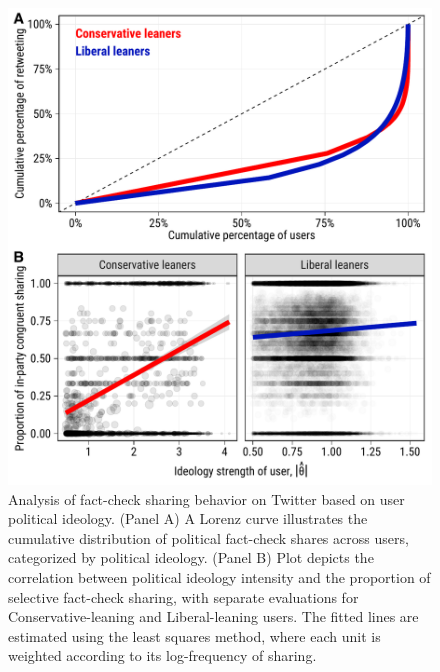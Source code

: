\documentclass[
  12pt,
]{article}
\begin{document}
\begin{figure}[!ht]
\centering
    \includegraphics[width=\textwidth]{../fig/merged_fig3.pdf}
    \caption{Analysis of fact-check sharing behavior on Twitter based on user political ideology. (Panel A) A Lorenz curve illustrates the cumulative distribution of political fact-check shares across users, categorized by political ideology. (Panel B) Plot depicts the correlation between political ideology intensity and the proportion of selective fact-check sharing, with separate evaluations for Conservative-leaning and Liberal-leaning users. The fitted lines are estimated using the least squares method, where each unit is weighted according to its log-frequency of sharing.}
    \label{fig:fig3}
\end{figure}
\end{document}
